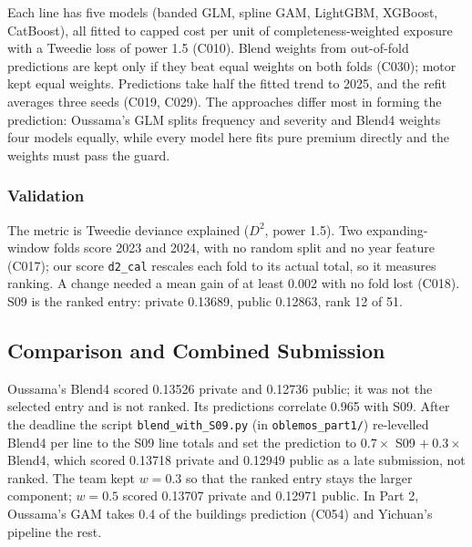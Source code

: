 Each line has five models (banded GLM, spline GAM, LightGBM, XGBoost, CatBoost), all fitted to capped cost per unit of
completeness-weighted exposure with a Tweedie loss of power 1.5 (C010). Blend weights from out-of-fold predictions are
kept only if they beat equal weights on both folds (C030); motor kept equal weights. Predictions take half the fitted trend to 2025,
and the refit averages three seeds (C019, C029). The approaches differ most in forming the prediction: Oussama's GLM splits frequency and severity and Blend4 weights four models equally, while every model here
fits pure premium directly and the weights must pass the guard.

\subsubsection{Validation}

The metric is Tweedie deviance explained ($D^2$, power 1.5). Two expanding-window folds score 2023 and 2024, with no
random split and no year feature (C017); our score \texttt{d2\_cal} rescales each fold to its actual total, so it
measures ranking. A change needed a mean gain of at least 0.002 with no fold lost (C018). S09 is the ranked entry:
private 0.13689, public 0.12863, rank 12 of 51.


\subsection{Comparison and Combined Submission}

Oussama's Blend4 scored 0.13526 private and 0.12736 public; it was not the selected entry and is not ranked. Its
predictions correlate 0.965 with S09. After the deadline the script \texttt{blend\_with\_S09.py} (in
\texttt{oblemos\_part1/}) re-levelled Blend4 per line to the S09 line totals and set the prediction to $0.7\times$ S09
$+\ 0.3\times$ Blend4, which scored 0.13718 private and 0.12949 public as a late submission, not ranked. The team kept
$w = 0.3$ so that the ranked entry stays the larger component; $w = 0.5$ scored 0.13707 private and 0.12971 public. In
Part 2, Oussama's GAM takes 0.4 of the buildings prediction (C054) and Yichuan's pipeline the rest.


